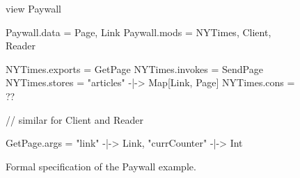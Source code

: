 \def\view{\textbf{view}\xspace}
\def\data{\textit{data}\xspace}

\def\paywall{\textsf{Paywall}}

\begin{figure}[ht]
\centering
  \begin{slangmath}[frame=single]
    view Paywall

    Paywall.data = {Page, Link}
    Paywall.mods = {NYTimes, Client, Reader}

    NYTimes.exports = {GetPage}
    NYTimes.invokes = {SendPage}
    NYTimes.stores  = {"articles" -|-> Map[Link, Page]}
    NYTimes.cons    = {??}

    // similar for Client and Reader

    GetPage.args = {"link" -|-> Link, "currCounter" -|-> Int}
  \end{slangmath}

\caption{Formal specification of the Paywall example.}
\label{fig-paywall-formal}
\end{figure}
